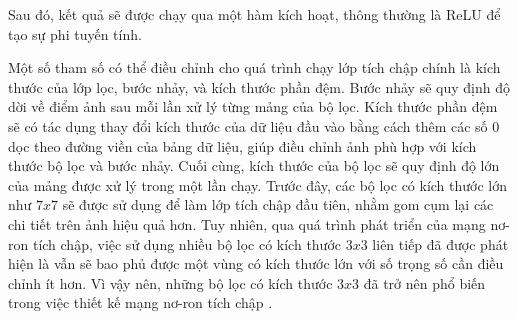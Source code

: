 Sau đó, kết quả sẽ được chạy qua một hàm kích hoạt, thông thường là ReLU để tạo sự phi tuyến tính.

Một số tham số có thể điều chỉnh cho quá trình chạy lớp tích chập chính là kích thước của lớp lọc, bước nhảy, và kích thước phần đệm. Bước nhảy sẽ quy định độ dời về điểm ảnh sau mỗi lần xử lý từng mảng của bộ lọc. Kích thước phần đệm sẽ có tác dụng thay đổi kích thước của dữ liệu đầu vào bằng cách thêm các số 0 dọc theo đường viền của bảng dữ liệu, giúp điều chỉnh ảnh phù hợp với kích thước bộ lọc và bước nhảy. Cuối cùng, kích thước của bộ lọc sẽ quy định độ lớn của mảng được xử lý trong một lần chạy. Trước đây, các bộ lọc có kích thước lớn như $7x7$ sẽ được sử dụng để làm lớp tích chập đầu tiên, nhằm gom cụm lại các chi tiết trên ảnh hiệu quả hơn. Tuy nhiên, qua quá trình phát triển của mạng nơ-ron tích chập, việc sử dụng nhiều bộ lọc có kích thước $3x3$ liên tiếp đã được phát hiện là vẫn sẽ bao phủ được một vùng có kích thước lớn với số trọng số cần điều chỉnh ít hơn. Vì vậy nên, những bộ lọc có kích thước $3x3$ đã trở nên phổ biến trong việc thiết kế mạng nơ-ron tích chập \cite{simonyan2015deep}.



